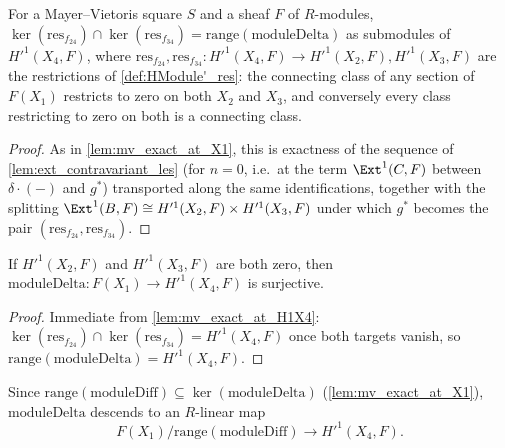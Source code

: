 \begin{lemma}[Exactness at \(H'^1(X_4,F)\)]
  \label{lem:mv_exact_at_H1X4}
  \leanok
  For a Mayer--Vietoris square \(S\) and a sheaf \(F\) of \(R\)-modules,
  \(\ker(\mathrm{res}_{f_{24}}) \cap \ker(\mathrm{res}_{f_{34}}) = \mathrm{range}(\mathrm{moduleDelta})\)
  as submodules of \(H'^1(X_4,F)\), where
  \(\mathrm{res}_{f_{24}}, \mathrm{res}_{f_{34}} : H'^1(X_4,F) \to H'^1(X_2,F), H'^1(X_3,F)\)
  are the restrictions of \ref{def:HModule'_res}: the connecting class of any section of
  \(F(X_1)\) restricts to zero on both \(X_2\) and \(X_3\), and conversely every class
  restricting to zero on both is a connecting class.
\end{lemma}
\begin{proof}
  \leanok
  As in \ref{lem:mv_exact_at_X1}, this is exactness of the sequence of
  \ref{lem:ext_contravariant_les} (for \(n=0\), i.e.\ at the term \(\Ext^1(C,F)\) between
  \(\delta \cdot (-)\) and \(g^*\)) transported along the same identifications, together
  with the splitting \(\Ext^1(B,F) \cong H'^1(X_2,F) \times H'^1(X_3,F)\) under which
  \(g^*\) becomes the pair \((\mathrm{res}_{f_{24}}, \mathrm{res}_{f_{34}})\).
\end{proof}

\begin{theorem}
  \label{thm:moduleDelta_surjective}
  \leanok
  If \(H'^1(X_2,F)\) and \(H'^1(X_3,F)\) are both zero, then
  \(\mathrm{moduleDelta} : F(X_1) \to H'^1(X_4,F)\) is surjective.
\end{theorem}
\begin{proof}
  \leanok
  Immediate from \ref{lem:mv_exact_at_H1X4}:
  \(\ker(\mathrm{res}_{f_{24}}) \cap \ker(\mathrm{res}_{f_{34}}) = H'^1(X_4,F)\) once both
  targets vanish, so \(\mathrm{range}(\mathrm{moduleDelta}) = H'^1(X_4,F)\).
\end{proof}

\begin{definition}
  \label{def:moduleDeltaQuotient}
  \leanok
  Since \(\mathrm{range}(\mathrm{moduleDiff}) \subseteq \ker(\mathrm{moduleDelta})\)
  (\ref{lem:mv_exact_at_X1}), \(\mathrm{moduleDelta}\) descends to an \(R\)-linear map
  \[
    F(X_1)/\mathrm{range}(\mathrm{moduleDiff}) \longrightarrow H'^1(X_4,F).
  \]
\end{definition}

